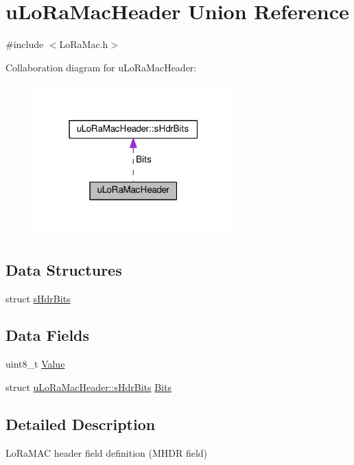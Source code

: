 \hypertarget{unionuLoRaMacHeader}{}\section{u\+Lo\+Ra\+Mac\+Header Union Reference}
\label{unionuLoRaMacHeader}


{\ttfamily \#include $<$Lo\+Ra\+Mac.\+h$>$}



Collaboration diagram for u\+Lo\+Ra\+Mac\+Header\+:
\nopagebreak
\begin{figure}[H]
\begin{center}
\leavevmode
\includegraphics[width=220pt]{unionuLoRaMacHeader__coll__graph}
\end{center}
\end{figure}
\subsection*{Data Structures}
\begin{DoxyCompactItemize}
\item 
struct \hyperlink{structuLoRaMacHeader_1_1sHdrBits}{s\+Hdr\+Bits}
\end{DoxyCompactItemize}
\subsection*{Data Fields}
\begin{DoxyCompactItemize}
\item 
uint8\+\_\+t \hyperlink{unionuLoRaMacHeader_aa85438c8c356d6d6c82c611c86a9c7fc}{Value}
\item 
struct \hyperlink{structuLoRaMacHeader_1_1sHdrBits}{u\+Lo\+Ra\+Mac\+Header\+::s\+Hdr\+Bits} \hyperlink{unionuLoRaMacHeader_a74f0f1fc2a3e7ecae7817e2bdc025eee}{Bits}
\end{DoxyCompactItemize}


\subsection{Detailed Description}
Lo\+Ra\+M\+AC header field definition (M\+H\+DR field)

